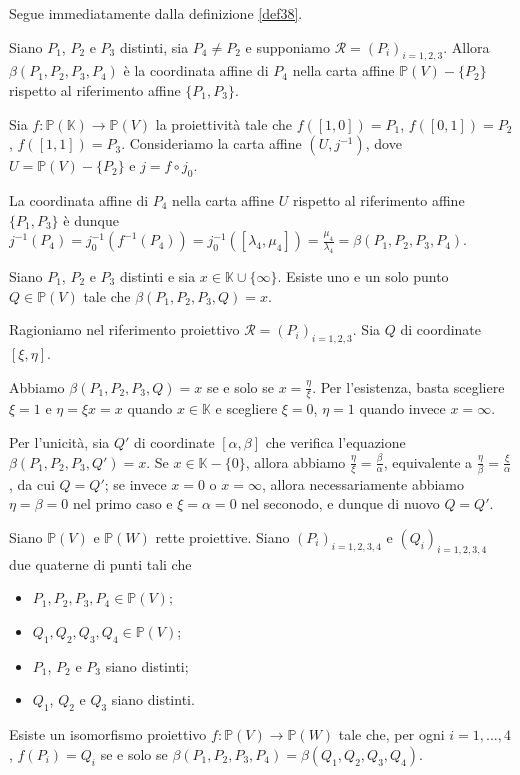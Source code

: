 \Proof Segue immediatamente dalla definizione \ref{def38}. \EndProof
\begin{Theorem}\label{th43}
	Siano $P_1$, $P_2$ e $P_3$ distinti, sia $P_4 \neq P_2$ e supponiamo $\mathcal{R} = (P_i)_{i = 1, 2, 3}$. Allora $\beta(P_1, P_2, P_3, P_4)$ \`e la coordinata affine di $P_4$ nella carta affine $\mathbb{P}(V) - \lbrace P_2 \rbrace$ rispetto al riferimento affine $\lbrace P_1, P_3 \rbrace$.
\end{Theorem}
\Proof Sia $f: \mathbb{P}(\mathbb{K}) \rightarrow \mathbb{P}(V)$ la proiettivit\`a tale che $f([1,0]) = P_1$, $f([0,1]) = P_2$, $f([1,1]) = P_3$. Consideriamo la carta affine $(U, j^{-1})$, dove $U = \mathbb{P}(V) - \lbrace P_2 \rbrace$ e $j = f \circ j_0$.
	\par La coordinata affine di $P_4$ nella carta affine $U$ rispetto al riferimento affine $\lbrace P_1, P_3 \rbrace$ \`e dunque $j^{-1}(P_4) = j_0^{-1}(f^{-1}(P_4)) = j_0^{-1}([\lambda_4, \mu_4]) = \frac{\mu_4}{\lambda_4} = \beta(P_1, P_2, P_3, P_4)$. \EndProof
\begin{Theorem}\label{th44}
	Siano $P_1$, $P_2$ e $P_3$ distinti e sia $x \in \mathbb{K} \cup \lbrace \infty \rbrace$. Esiste uno e un solo punto $Q \in \mathbb{P}(V)$ tale che $\beta(P_1, P_2, P_3, Q) = x$.
\end{Theorem}
\Proof Ragioniamo nel riferimento proiettivo $\mathcal{R} = (P_i)_{i = 1,2,3}$. Sia $Q$ di coordinate $[\xi, \eta]$.
	\par Abbiamo $\beta(P_1, P_2, P_3, Q) = x$ se e solo se $x = \frac{\eta}{\xi}$. Per l'esistenza, basta scegliere $\xi = 1$ e $\eta = \xi x = x$ quando $x \in \mathbb{K}$ e scegliere $\xi = 0$, $\eta = 1$ quando invece $x = \infty$.
	\par Per l'unicit\`a, sia $Q'$ di coordinate $[\alpha, \beta]$ che verifica l'equazione $\beta(P_1, P_2, P_3, Q') = x$. Se $x \in \mathbb{K} - \lbrace 0 \rbrace$, allora abbiamo $\frac{\eta}{\xi} = \frac{\beta}{\alpha}$, equivalente a $\frac{\eta}{\beta} = \frac{\xi}{\alpha}$, da cui $Q = Q'$; se invece $x = 0$ o $x = \infty$, allora necessariamente abbiamo $\eta = \beta = 0$ nel primo caso e $\xi = \alpha = 0$ nel seconodo, e dunque di nuovo $Q = Q'$. \EndProof
\begin{Theorem}\label{th45}
	Siano $\mathbb{P}(V)$ e $\mathbb{P}(W)$ rette proiettive. Siano $(P_i)_{i = 1,2,3,4}$ e $(Q_i)_{i = 1,2,3,4}$ due quaterne di punti tali che
	\begin{itemize}
		\item $P_1, P_2, P_3, P_4 \in \mathbb{P}(V)$;\\
		\item $Q_1, Q_2, Q_3, Q_4 \in \mathbb{P}(V)$;\\
		\item $P_1$, $P_2$ e $P_3$ siano distinti;\\
		\item $Q_1$, $Q_2$ e $Q_3$ siano distinti.
	\end{itemize}
	Esiste un isomorfismo proiettivo $f: \mathbb{P}(V) \rightarrow \mathbb{P}(W)$ tale che, per ogni $i = 1, ..., 4$, $f(P_i) = Q_i$ se e solo se $\beta(P_1,P_2,P_3,P_4) = \beta(Q_1, Q_2, Q_3, Q_4)$.
\end{Theorem}
